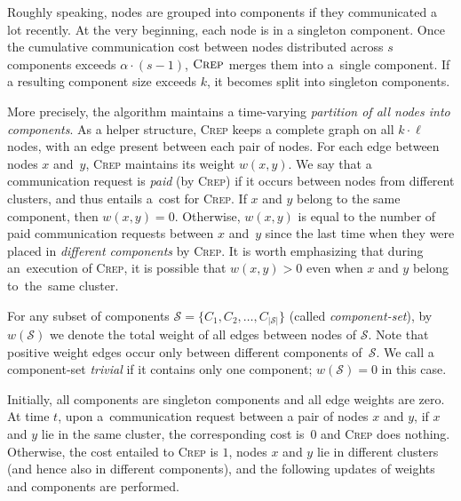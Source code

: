 \documentclass{siamart190516}
\newcommand{\CREP}{\textsc{Crep}\xspace}
\newcommand{\set}{\mathcal{S}}
\begin{document}
Roughly speaking, nodes are grouped into components if they communicated a lot
recently. At the very beginning, each node is in a singleton component. Once
the cumulative communication cost between nodes distributed across $s$
components exceeds $\alpha \cdot (s-1)$, $\CREP$ merges them into a~single
component. If a resulting component size exceeds $k$, it becomes split
into singleton components.

More precisely, the algorithm maintains a time-varying \emph{partition of all
nodes into components}. As a helper structure, \CREP keeps a complete graph on
all $k \cdot \ell$ nodes, with an edge present between each pair of nodes. For
each edge between nodes $x$ and~$y$, \CREP maintains its weight $w(x,y)$. We
say that a communication request is \emph{paid} (by \CREP) if it occurs
between nodes from different clusters, and thus entails a~cost for \CREP. If
$x$ and $y$ belong to the same component, then $w(x,y) = 0$. Otherwise,
$w(x,y)$ is equal to the number of paid communication requests between $x$
and~$y$ since the last time when they were placed in \emph{different components} 
by \CREP. It is worth emphasizing that during an~execution of \CREP, it is
possible that $w(x,y) > 0$ even when $x$ and $y$ belong to~the~same cluster.

For any subset of components $\set = \{ C_1, C_2, \ldots, C_{|\set|} \}$ (called
\emph{component-set}), by~$w(\set)$ we denote the total weight of all edges
between nodes of $\set$. Note that positive weight edges occur only between
different components of~$\set$. We call a component-set \emph{trivial} if it
contains only one component; $w(\set) = 0$ in this case.

Initially, all components are singleton components and all edge weights are
zero. At time $t$, upon a~communication request between a pair of nodes $x$
and $y$, if $x$ and $y$ lie in the same cluster, the corresponding cost is~$0$
and \CREP does nothing. Otherwise, the cost entailed to \CREP is $1$, nodes
$x$ and $y$ lie in different clusters (and hence also in different
components), and the following updates of weights and components are
performed.
\end{document}

